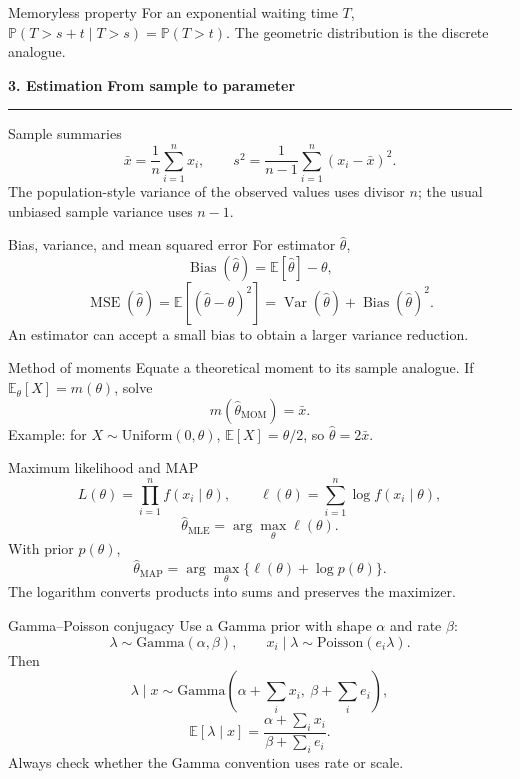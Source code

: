 \documentclass[10pt,a4paper]{article}
\newcommand{\sectionbanner}[2]{%
  \vspace{2mm}
  {\color{navy}\Large\bfseries #1}\hfill
  {\color{blue}\bfseries #2}
  \par\vspace{1mm}\color{line}\rule{\linewidth}{0.8pt}\color{ink}\vspace{2mm}
}
\newcommand{\E}{\mathbb{E}}
\newcommand{\Var}{\operatorname{Var}}
\newcommand{\Prob}{\mathbb{P}}
\begin{document}
\begin{keybox}{Memoryless property}
For an exponential waiting time $T$, $\Prob(T>s+t\mid T>s)=\Prob(T>t)$. The geometric distribution is the discrete analogue.
\end{keybox}

\newpage
\sectionbanner{3. Estimation}{From sample to parameter}

\begin{formulabox}{Sample summaries}
\[
\bar{x}=\frac1n\sum_{i=1}^{n}x_i,\qquad
s^2=\frac{1}{n-1}\sum_{i=1}^{n}(x_i-\bar{x})^2.
\]
The population-style variance of the observed values uses divisor $n$; the usual unbiased sample variance uses $n-1$.
\end{formulabox}

\begin{formulabox}{Bias, variance, and mean squared error}
For estimator $\hat\theta$,
\[
\operatorname{Bias}(\hat\theta)=\E[\hat\theta]-\theta,
\]
\[
\operatorname{MSE}(\hat\theta)=\E[(\hat\theta-\theta)^2]
=\Var(\hat\theta)+\operatorname{Bias}(\hat\theta)^2.
\]
An estimator can accept a small bias to obtain a larger variance reduction.
\end{formulabox}

\begin{formulabox}{Method of moments}
Equate a theoretical moment to its sample analogue. If $\E_{\theta}[X]=m(\theta)$, solve
\[
m(\hat\theta_{\mathrm{MOM}})=\bar{x}.
\]
Example: for $X\sim\mathrm{Uniform}(0,\theta)$, $\E[X]=\theta/2$, so $\hat\theta=2\bar{x}$.
\end{formulabox}

\begin{formulabox}{Maximum likelihood and MAP}
\[
L(\theta)=\prod_{i=1}^{n}f(x_i\mid\theta),\qquad
\ell(\theta)=\sum_{i=1}^{n}\log f(x_i\mid\theta),
\]
\[
\hat\theta_{\mathrm{MLE}}=\arg\max_{\theta}\ell(\theta).
\]
With prior $p(\theta)$,
\[
\hat\theta_{\mathrm{MAP}}
=\arg\max_{\theta}\{\ell(\theta)+\log p(\theta)\}.
\]
The logarithm converts products into sums and preserves the maximizer.
\end{formulabox}

\begin{formulabox}{Gamma--Poisson conjugacy}
Use a Gamma prior with shape $\alpha$ and rate $\beta$:
\[
\lambda\sim\mathrm{Gamma}(\alpha,\beta),\qquad
x_i\mid\lambda\sim\mathrm{Poisson}(e_i\lambda).
\]
Then
\[
\lambda\mid x
\sim\mathrm{Gamma}\left(\alpha+\sum_i x_i,\ \beta+\sum_i e_i\right),
\]
\[
\E[\lambda\mid x]=
\frac{\alpha+\sum_i x_i}{\beta+\sum_i e_i}.
\]
Always check whether the Gamma convention uses rate or scale.
\end{formulabox}
\end{document}
